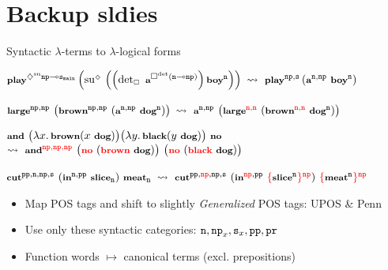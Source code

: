 \documentclass[aspectratio=169,handout]{beamer}
\newcommand{\hlt}[1]{\textcolor{red}{#1}}
\newcommand{\depBE}[1]{#1_{\scriptscriptstyle\Box}\,}
\newcommand{\depDI}[1]{#1^{\scriptscriptstyle\diamondsuit}\,}
\newcommand{\type}[1]{\ensuremath\mathtt{#1}}
\newcommand{\np}{\type{np}}
\newcommand{\n}{\type{n}}
\newcommand{\pr}{\type{pr}}
\newcommand{\pp}{\type{pp}}
\newcommand{\smain}{\type{s_{main}}}
\newcommand{\s}{\type{s}}
\begin{document}
\section{Backup sldies}
\begin{frame}{Syntactic $\lambda$-terms to $\lambda$-logical forms}

$\synt{play}^{\diamondsuit^{\text{su}}\np\multimap\smain}
\left(
    \depDI{\text{su}}
    \left(
        \left(
            \depBE{\text{det}}~\synt{a}^{\Box^\text{det}(\n \multimap \np)}
        \right)
        \synt{boy}^\n
    \right)
\right)$
\hfill $\leadsto ~ 
\synt{play}^{\np,\s}
    \left(
        \synt{a}^{\n,\np} ~ \synt{boy}^\n
    \right)
$\vfill

$\synt{large}^{\np,\np}~\big(\synt{brown}^{\np,\np}~(\synt{a}^{\n,\np}~\synt{dog}^{\n})\big)$
\hfill $\leadsto ~ 
\synt{a}^{\n,\np}~\big(\synt{large}^{\hlt{\n,\n}}~(\synt{brown}^{\hlt{\n,\n}}~\synt{dog}^{\n})\big)
$\vfill

$\synt{and}~\big(\abst{x} \synt{brown}  (x~\synt{dog})\big) \big(\abst{y} \synt{black}  (y~\synt{dog})\big)~\synt{no}$\\\medskip
\hfill $\leadsto ~ 
\synt{and}^{\hlt{\np,\np,\np}}~\big(\hlt{\synt{no}}~(\hlt{\synt{brown}}~\synt{dog})\big)~\big(\hlt{\synt{no}}~(\hlt{\synt{black}}~\synt{dog})\big)
$\vfill

$
\synt{cut}^{\pp,\n,\np,\s}~(\synt{in}^{\n,\pp}~\synt{slice}_\n)~\synt{meat}_\n$
\hfill $\leadsto ~ 
\synt{cut}^{\pp,\hlt{\np},\np,\s}~(\synt{in}^{\hlt{\np},\pp}~\hlt{\{}\synt{slice}^\n\hlt{\}^\np})~\hlt{\{}\synt{meat}^{\n}\hlt{\}^\np}
\label{r:n_to_np}
$
\bigskip

\begin{itemize}
\item Map POS tags and shift to slightly \emph{Generalized} POS tags: UPOS \& Penn
\item Use only these syntactic categories: $\n, \np_x, \s_x, \pp, \pr$
\item Function words $\mapsto$ canonical terms (excl. prepositions)\kern-30mm
\end{itemize}
    
\end{frame}
\end{document}
